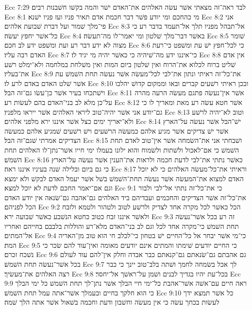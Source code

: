 Ecc 7:29  לבד ראה־זה מצאתי אשׁר עשׂה האלהים את־האדם ישׁר והמה בקשׁו חשׁבנות רבים׃
Ecc 8:1  מי כהחכם ומי יודע פשׁר דבר חכמת אדם תאיר פניו ועז פניו ישׁנא׃
Ecc 8:2  אני פי־מלך שׁמור ועל דברת שׁבועת אלהים׃
Ecc 8:3  אל־תבהל מפניו תלך אל־תעמד בדבר רע כי כל־אשׁר יחפץ יעשׂה׃
Ecc 8:4  באשׁר דבר־מלך שׁלטון ומי יאמר־לו מה־תעשׂה׃
Ecc 8:5  שׁומר מצוה לא ידע דבר רע ועת ומשׁפט ידע לב חכם׃
Ecc 8:6  כי לכל־חפץ ישׁ עת ומשׁפט כי־רעת האדם רבה עליו׃
Ecc 8:7  כי־איננו ידע מה־שׁיהיה כי כאשׁר יהיה מי יגיד לו׃
Ecc 8:8  אין אדם שׁליט ברוח לכלוא את־הרוח ואין שׁלטון ביום המות ואין משׁלחת במלחמה ולא־ימלט רשׁע את־בעליו׃
Ecc 8:9  את־כל־זה ראיתי ונתון את־לבי לכל־מעשׂה אשׁר נעשׂה תחת השׁמשׁ עת אשׁר שׁלט האדם באדם לרע לו׃
Ecc 8:10  ובכן ראיתי רשׁעים קברים ובאו וממקום קדושׁ יהלכו וישׁתכחו בעיר אשׁר כן־עשׂו גם־זה הבל׃
Ecc 8:11  אשׁר אין־נעשׂה פתגם מעשׂה הרעה מהרה על־כן מלא לב בני־האדם בהם לעשׂות רע׃
Ecc 8:12  אשׁר חטא עשׂה רע מאת ומאריך לו כי גם־יודע אני אשׁר יהיה־טוב ליראי האלהים אשׁר ייראו מלפניו׃
Ecc 8:13  וטוב לא־יהיה לרשׁע ולא־יאריך ימים כצל אשׁר איננו ירא מלפני אלהים׃
Ecc 8:14  ישׁ־הבל אשׁר נעשׂה על־הארץ אשׁר ישׁ צדיקים אשׁר מגיע אלהם כמעשׂה הרשׁעים וישׁ רשׁעים שׁמגיע אלהם כמעשׂה הצדיקים אמרתי שׁגם־זה הבל׃
Ecc 8:15  ושׁבחתי אני את־השׂמחה אשׁר אין־טוב לאדם תחת השׁמשׁ כי אם־לאכול ולשׁתות ולשׂמוח והוא ילונו בעמלו ימי חייו אשׁר־נתן־לו האלהים תחת השׁמשׁ׃
Ecc 8:16  כאשׁר נתתי את־לבי לדעת חכמה ולראות את־הענין אשׁר נעשׂה על־הארץ כי גם ביום ובלילה שׁנה בעיניו איננו ראה׃
Ecc 8:17  וראיתי את־כל־מעשׂה האלהים כי לא יוכל האדם למצוא את־המעשׂה אשׁר נעשׂה תחת־השׁמשׁ בשׁל אשׁר יעמל האדם לבקשׁ ולא ימצא וגם אם־יאמר החכם לדעת לא יוכל למצא׃
Ecc 9:1  כי את־כל־זה נתתי אל־לבי ולבור את־כל־זה אשׁר הצדיקים והחכמים ועבדיהם ביד האלהים גם־אהבה גם־שׂנאה אין יודע האדם הכל לפניהם׃
Ecc 9:2  הכל כאשׁר לכל מקרה אחד לצדיק ולרשׁע לטוב ולטהור ולטמא ולזבח ולאשׁר איננו זבח כטוב כחטא הנשׁבע כאשׁר שׁבועה ירא׃
Ecc 9:3  זה רע בכל אשׁר־נעשׂה תחת השׁמשׁ כי־מקרה אחד לכל וגם לב בני־האדם מלא־רע והוללות בלבבם בחייהם ואחריו אל־המתים׃
Ecc 9:4  כי־מי אשׁר יבחר אל כל־החיים ישׁ בטחון כי־לכלב חי הוא טוב מן־האריה המת׃
Ecc 9:5  כי החיים יודעים שׁימתו והמתים אינם יודעים מאומה ואין־עוד להם שׂכר כי נשׁכח זכרם׃
Ecc 9:6  גם אהבתם גם־שׂנאתם גם־קנאתם כבר אבדה וחלק אין־להם עוד לעולם בכל אשׁר־נעשׂה תחת השׁמשׁ׃
Ecc 9:7  לך אכל בשׂמחה לחמך ושׁתה בלב־טוב יינך כי כבר רצה האלהים את־מעשׂיך׃
Ecc 9:8  בכל־עת יהיו בגדיך לבנים ושׁמן על־ראשׁך אל־יחסר׃
Ecc 9:9  ראה חיים עם־אשׁה אשׁר־אהבת כל־ימי חיי הבלך אשׁר נתן־לך תחת השׁמשׁ כל ימי הבלך כי הוא חלקך בחיים ובעמלך אשׁר־אתה עמל תחת השׁמשׁ׃
Ecc 9:10  כל אשׁר תמצא ידך לעשׂות בכחך עשׂה כי אין מעשׂה וחשׁבון ודעת וחכמה בשׁאול אשׁר אתה הלך שׁמה׃

